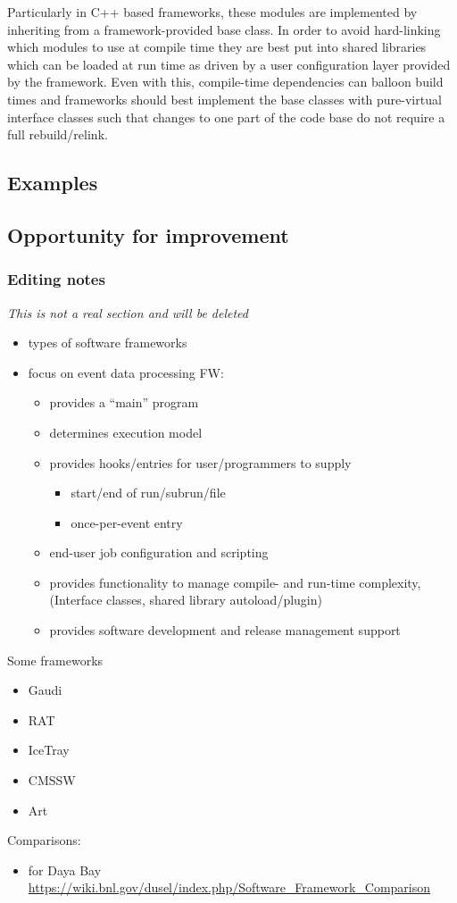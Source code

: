 	Particularly in C++ based frameworks,
these modules are implemented by inheriting from a framework-provided
base class. In order to avoid hard-linking which modules to use at
compile time they are best put into shared libraries which can be
loaded at run time as driven by a user configuration layer provided by
the framework.  Even with this, compile-time dependencies can balloon
build times and frameworks should best implement the base classes with
pure-virtual interface classes such that changes to one part of the
code base do not require a full rebuild/relink.

\subsection{Examples}
\subsection{Opportunity for improvement}


\subsubsection{Editing notes}


\textit{This is not a real section and will be deleted}

\begin{itemize}
\item types of software frameworks
\item focus on event data processing FW:
  \begin{itemize}
  \item provides a ``main'' program
  \item determines execution model
  \item provides hooks/entries for user/programmers to supply
    \begin{itemize}
    \item start/end of run/subrun/file
    \item once-per-event entry
    \end{itemize}
  \item end-user job configuration and scripting
  \item provides functionality to manage compile- and run-time complexity, (Interface classes, shared library autoload/plugin)
  \item provides software development and release management support
  \end{itemize}
\end{itemize}
Some frameworks
\begin{itemize}
\item Gaudi
\item RAT
\item IceTray
\item CMSSW
\item Art
\end{itemize}
Comparisons:
\begin{itemize}
\item for Daya Bay \url{https://wiki.bnl.gov/dusel/index.php/Software_Framework_Comparison}
\end{itemize}
